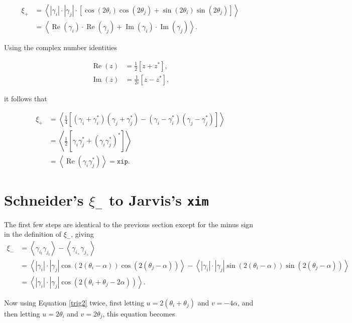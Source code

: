 \documentclass[%
 reprint,
 amsmath,amssymb,
 aps,nofootinbib
]{revtex4-1}
\begin{document}
\begin{align*}
\xi_+&=\left<|\gamma_i|\cdot|\gamma_j|\cdot\left[\cos\left(2\theta_i\right)\cos\left(2\theta_j\right)+\sin\left(2\theta_i\right)\sin\left(2\theta_j\right)\right]\right>\\
&=\left<\operatorname{Re}(\gamma_i)\cdot\operatorname{Re}(\gamma_j)+\operatorname{Im}(\gamma_i)\cdot\operatorname{Im}(\gamma_j)\right>.
\end{align*}

Using the complex number identities

\begin{align}
\operatorname{Re}(z)&=\frac{1}{2}\left[z+z^*\right],\label{complex1}\\
\operatorname{Im}(z)&=\frac{1}{2i}\left[z-z^*\right]\label{complex2},
\end{align}

it follows that

\begin{align*}
\xi_+&=\left<\frac{1}{4}\left[(\gamma_i+\gamma_i^*)(\gamma_j+\gamma_j^*)-(\gamma_i-\gamma_i^*)(\gamma_j-\gamma_j^*)\right]\right>\\
&=\left<\frac{1}{2}\left[\gamma_i\gamma_j^*+(\gamma_i\gamma_j^*)^*\right]\right>\\
&=\left<\operatorname{Re}(\gamma_i\gamma_j^*)\right>=\texttt{xip}.
\end{align*}

\section*{Schneider's $\xi_-$ to Jarvis's \texttt{xim}}

The first few steps are identical to the previous section except for the minus sign in the definition of $\xi_-$, giving
\begin{align*}
\xi_-&=\left<\gamma_{i_t}\gamma_{j_t}\right>-\left<\gamma_{i_\times}\gamma_{j_\times}\right>\\
&=\left<|\gamma_i|\cdot|\gamma_j|\cos\left(2(\theta_i-\alpha)\right)\cos\left(2(\theta_j-\alpha)\right)\right>-\left<|\gamma_i|\cdot|\gamma_j|\sin\left(2(\theta_i-\alpha)\right)\sin\left(2(\theta_j-\alpha)\right)\right>\\
&=\left<|\gamma_i|\cdot|\gamma_j|\cos\left(2(\theta_i+\theta_j-2\alpha)\right)\right>.
\end{align*}

Now using Equation \eqref{trig2} twice, first letting $u=2(\theta_i+\theta_j)$ and $v=-4\alpha$, and then letting $u=2\theta_i$ and $v=2\theta_j$, this equation becomes
\end{document}
